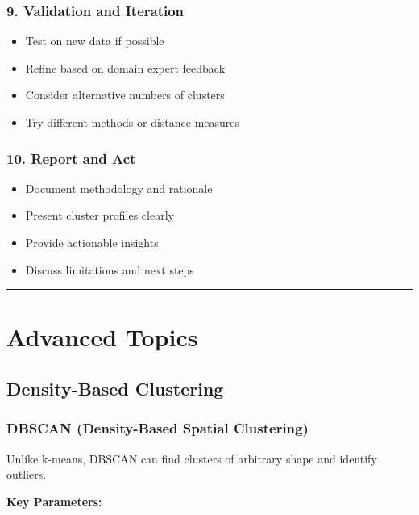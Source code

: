\documentclass[
]{article}
\begin{document}
\subsubsection{9. Validation and Iteration}

\begin{itemize}
\item
  Test on new data if possible
\item
  Refine based on domain expert feedback
\item
  Consider alternative numbers of clusters
\item
  Try different methods or distance measures
\end{itemize}

\subsubsection{10. Report and Act}

\begin{itemize}
\item
  Document methodology and rationale
\item
  Present cluster profiles clearly
\item
  Provide actionable insights
\item
  Discuss limitations and next steps
\end{itemize}

\begin{center}\rule{0.5\linewidth}{0.5pt}\end{center}

\textbf{ }

\section{Advanced Topics}

\textbf{ }

\subsection{Density-Based Clustering}

\subsubsection{DBSCAN (Density-Based Spatial Clustering)}

Unlike k-means, DBSCAN can find clusters of arbitrary shape and identify
outliers.

\textbf{Key Parameters:}
\end{document}
